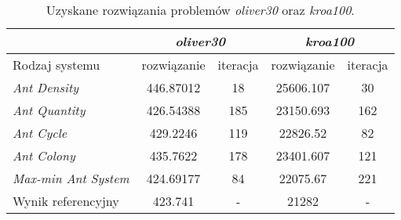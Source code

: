 {{{            \begin{table}
                \centering
                \begin{tabular}{ |l|c c|c c| }
                    \hline
                    & \multicolumn{2}{c|}{\textit{oliver30}} & \multicolumn{2}{c|}{\textit{kroa100}} \\
                    \hline
                    Rodzaj systemu & rozwiązanie & iteracja & rozwiązanie & iteracja \\
                    \hline
                    \textit{Ant Density} & 446.87012 & 18 & 25606.107 & 30 \\
                    \textit{Ant Quantity} & 426.54388 & 185 & 23150.693 & 162 \\
                    \textit{Ant Cycle} & 429.2246 & 119 & 22826.52 & 82 \\
                    \textit{Ant Colony} & 435.7622 & 178 & 23401.607 & 121 \\
                    \textit{Max-min Ant System} & 424.69177 & 84 & 22075.67 & 221 \\
                    \hline
                    Wynik referencyjny & 423.741 & - & 21282 & - \\
                    \hline
                \end{tabular}
                \caption{Uzyskane rozwiązania problemów \textit{oliver30} oraz \textit{kroa100}.}
                \label{tab:impl-tsp-results}
            \end{table}
        }
    }
}

